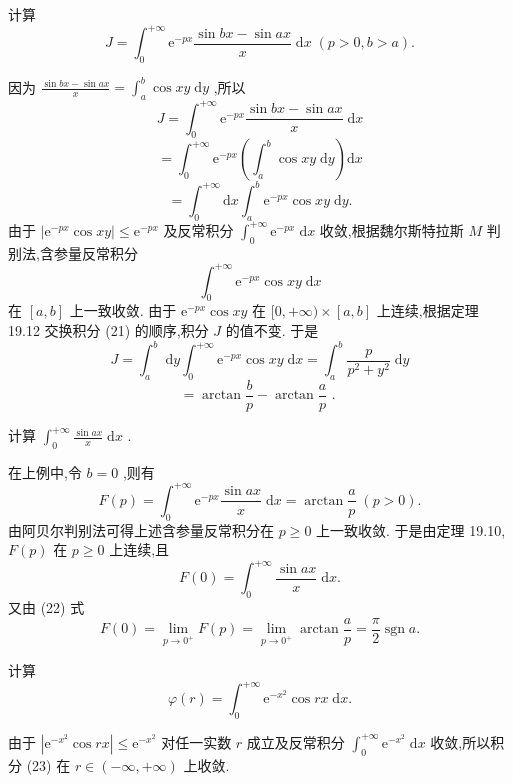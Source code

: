 \begin{example}

\end{example}
计算
\[
J = {\int }_{0}^{+\infty }{\mathrm{e}}^{-{px}}\frac{\sin {bx} - \sin {ax}}{x}\mathrm{\;d}x\;\left( {p > 0,b > a}\right) .
\]
\begin{solution}

\end{solution}
因为 \(\frac{\sin {bx} - \sin {ax}}{x} = {\int }_{a}^{b}\cos {xy}\mathrm{\;d}y\) ,所以
\[
J = {\int }_{0}^{+\infty }{\mathrm{e}}^{-{px}}\frac{\sin {bx} - \sin {ax}}{x}\mathrm{\;d}x
\]
\[
= {\int }_{0}^{+\infty }{\mathrm{e}}^{-{px}}\left( {{\int }_{a}^{b}\cos {xy}\mathrm{\;d}y}\right) \mathrm{d}x
\]
\[
= {\int }_{0}^{+\infty }\mathrm{d}x{\int }_{a}^{b}{\mathrm{e}}^{-{px}}\cos {xy}\mathrm{\;d}y. \tag{21}
\]
由于 \(\left| {{\mathrm{e}}^{-{px}}\cos {xy}}\right|  \leq  {\mathrm{e}}^{-{px}}\) 及反常积分 \({\int }_{0}^{+\infty }{\mathrm{e}}^{-{px}}\mathrm{\;d}x\) 收敛,根据魏尔斯特拉斯 \(M\) 判别法,含参量反常积分
\[
{\int }_{0}^{+\infty }{\mathrm{e}}^{-{px}}\cos {xy}\mathrm{\;d}x
\]
在 \(\left\lbrack  {a,b}\right\rbrack\) 上一致收敛. 由于 \({\mathrm{e}}^{-{px}}\cos {xy}\) 在 \(\lbrack 0, + \infty ) \times  \left\lbrack  {a,b}\right\rbrack\) 上连续,根据定理 19.12 交换积分 (21) 的顺序,积分 \(J\) 的值不变. 于是
\[
J = {\int }_{a}^{b}\mathrm{\;d}y{\int }_{0}^{+\infty }{\mathrm{e}}^{-{px}}\cos {xy}\mathrm{\;d}x = {\int }_{a}^{b}\frac{p}{{p}^{2} + {y}^{2}}\mathrm{\;d}y
\]
\[
= \arctan \frac{b}{p} - \arctan \frac{a}{p}\text{ . }
\]
\begin{example}

\end{example}
计算 \({\int }_{0}^{+\infty }\frac{\sin {ax}}{x}\mathrm{\;d}x\) .

\begin{solution}

\end{solution}
在上例中,令 \(b = 0\) ,则有
\[
F\left( p\right)  = {\int }_{0}^{+\infty }{\mathrm{e}}^{-{px}}\frac{\sin {ax}}{x}\mathrm{\;d}x = \arctan \frac{a}{p}\;\left( {p > 0}\right) . \tag{22}
\]
由阿贝尔判别法可得上述含参量反常积分在 \(p \geq  0\) 上一致收敛. 于是由定理 19.10, \(F\left( p\right)\) 在 \(p \geq  0\) 上连续,且
\[
F\left( 0\right)  = {\int }_{0}^{+\infty }\frac{\sin {ax}}{x}\mathrm{\;d}x.
\]
又由 (22) 式
\[
F\left( 0\right)  = \mathop{\lim }\limits_{{p \rightarrow  {0}^{ + }}}F\left( p\right)  = \mathop{\lim }\limits_{{p \rightarrow  {0}^{ + }}}\arctan \frac{a}{p} = \frac{\pi }{2}\operatorname{sgn}a.
\]
\begin{example}

\end{example}
计算
\[
\varphi \left( r\right)  = {\int }_{0}^{+\infty }{\mathrm{e}}^{-{x}^{2}}\cos {rx}\mathrm{\;d}x. \tag{23}
\]
\begin{solution}

\end{solution}
由于 \(\left| {{\mathrm{e}}^{-{x}^{2}}\cos {rx}}\right|  \leq  {\mathrm{e}}^{-{x}^{2}}\) 对任一实数 \(r\) 成立及反常积分 \({\int }_{0}^{+\infty }{\mathrm{e}}^{-{x}^{2}}\mathrm{\;d}x\) 收敛,所以积分 (23) 在 \(r \in  \left( {-\infty , + \infty }\right)\) 上收敛.

